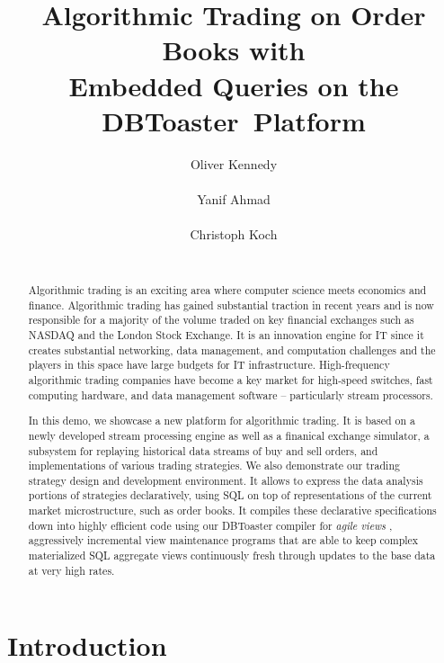 \documentclass{vldb}
\newcommand{\compiler}{DBToaster}
\begin{document}
\title{Algorithmic Trading on Order Books with\\Embedded Queries on the
\compiler\ Platform}
\author{
\alignauthor
Oliver Kennedy\\
\\
\alignauthor
Yanif Ahmad\\
\\
\alignauthor
Christoph Koch\\
\\
}
\maketitle

\begin{abstract}
Algorithmic trading is an exciting area where computer science meets economics
and finance. Algorithmic trading has gained substantial traction in recent years
and is now responsible for a majority of the volume traded on key financial
exchanges such as NASDAQ and the London Stock Exchange. It is an innovation
engine for IT since it creates substantial networking, data management, and
computation challenges and the players in this space have large budgets for IT
infrastructure. High-frequency algorithmic trading companies have become a key
market for high-speed switches, fast computing hardware, and data management
software -- particularly stream processors.

In this demo, we showcase a new platform for algorithmic trading. It is based on
a newly developed stream processing engine as well as a finanical exchange
simulator, a subsystem for replaying historical data streams of buy and sell
orders, and implementations of various trading strategies. We also demonstrate
our trading strategy design and development environment. It allows to express
the data analysis portions of strategies declaratively, using SQL on top of
representations of the current market microstructure, such as order books. It
compiles these declarative specifications down into highly efficient code using
our DBToaster compiler for {\em agile views} \cite{KAK2011}, aggressively
incremental view maintenance programs that are able to keep complex materialized
SQL aggregate views continuously fresh through updates to the base data at very
high rates.
\end{abstract}

\section{Introduction}
\end{document}
